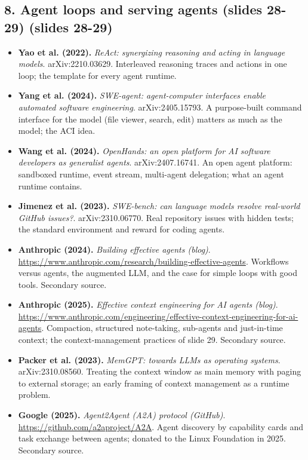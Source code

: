 \documentclass[11pt,letterpaper]{article}
\begin{document}
\subsection*{8. Agent loops and serving agents (slides 28-29) (slides 28-29)}
\begin{itemize}[leftmargin=1.2em,itemsep=3pt]\sloppy
\item \textbf{Yao et al. (2022).} \textit{ReAct: synergizing reasoning and acting in language models}. arXiv:2210.03629. Interleaved reasoning traces and actions in one loop; the template for every agent runtime.
\item \textbf{Yang et al. (2024).} \textit{SWE-agent: agent-computer interfaces enable automated software engineering}. arXiv:2405.15793. A purpose-built command interface for the model (file viewer, search, edit) matters as much as the model; the ACI idea.
\item \textbf{Wang et al. (2024).} \textit{OpenHands: an open platform for AI software developers as generalist agents}. arXiv:2407.16741. An open agent platform: sandboxed runtime, event stream, multi-agent delegation; what an agent runtime contains.
\item \textbf{Jimenez et al. (2023).} \textit{SWE-bench: can language models resolve real-world GitHub issues?}. arXiv:2310.06770. Real repository issues with hidden tests; the standard environment and reward for coding agents.
\item \textbf{Anthropic (2024).} \textit{Building effective agents (blog)}. \url{https://www.anthropic.com/research/building-effective-agents}. Workflows versus agents, the augmented LLM, and the case for simple loops with good tools. Secondary source.
\item \textbf{Anthropic (2025).} \textit{Effective context engineering for AI agents (blog)}. \url{https://www.anthropic.com/engineering/effective-context-engineering-for-ai-agents}. Compaction, structured note-taking, sub-agents and just-in-time context; the context-management practices of slide 29. Secondary source.
\item \textbf{Packer et al. (2023).} \textit{MemGPT: towards LLMs as operating systems}. arXiv:2310.08560. Treating the context window as main memory with paging to external storage; an early framing of context management as a runtime problem.
\item \textbf{Google (2025).} \textit{Agent2Agent (A2A) protocol (GitHub)}. \url{https://github.com/a2aproject/A2A}. Agent discovery by capability cards and task exchange between agents; donated to the Linux Foundation in 2025. Secondary source.
\end{itemize}
\clearpage
\printindex
\end{document}
